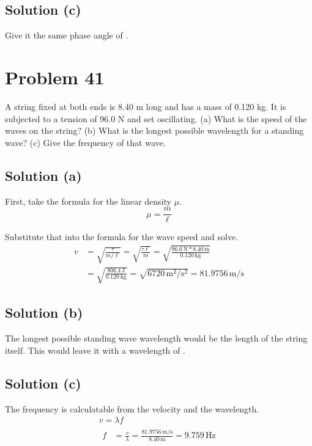 \documentclass[12pt]{article}
\begin{document}
        \subsection{Solution (c)}
            Give it the same phase angle of . 

    \section{Problem 41}
        A string fixed at both ends is 8.40 m long and has a mass of 0.120 kg. 
        It is subjected to a tension of 96.0 N and set oscillating. 
        (a) What is the speed of the waves on the string? 
        (b) What is the longest possible wavelength for a standing wave? 
        (c) Give the frequency of that wave.

        \subsection{Solution (a)}
            First, take the formula for the linear density $\mu$.
            \begin{equation}
                \mu =   \frac{m}{\ell}
            \end{equation}

            Substitute that into the formula for the wave speed and solve.
            \begin{align}
                v   &=  \sqrt{\frac{\tau}{m/\ell}}
                    =   \sqrt{\frac{\tau \ell}{m}}
                    =   \sqrt{\frac{96.0\,\unit{\newton} * 8.40\,\unit{\meter}}{0.120\,\unit{\kilo\gram}}}\\
                    &=  \sqrt{\frac{806.4\,\unit{\joule}}{0.120\,\unit{\kilo\gram}}}
                    =   \sqrt{6720\,\unit{\meter^2/\second^2}}
                    =   \boxed{81.9756\,\unit{\meter/\second}}
            \end{align}

        \subsection{Solution (b)}
            The longest possible standing wave wavelength would be the length of the string itself.
            This would leave it with a wavelength of . 

        \subsection{Solution (c)}
            The frequency is calculatable from the velocity and the wavelength.
            \begin{gather}
                v   =   \lambda f\\
                \begin{align}
                    f   &=  \frac{v}{\lambda}
                        =   \frac{81.9756\,\unit{\meter/\second}}{8.40\,\unit{\meter}}
                        =   \boxed{9.759\,\unit{\hertz}}
                \end{align}
            \end{gather}
\end{document}
